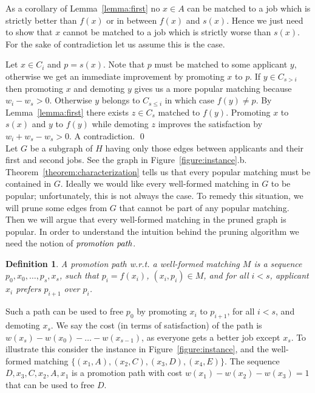\documentclass[11pt]{article}
\newcommand{\first}{f}
\newcommand{\second}{s}
\newcommand{\wrt}{{w.r.t.}\xspace}
\newtheorem{definition}{Definition}
\begin{document}
\myproof
As a corollary of Lemma~\ref{lemma:first} no $x \in A$ can be matched to a job which is strictly better than $\first(x)$ or in between $\first(x)$ and $\second(x)$. Hence we just need to show that $x$ cannot be matched to a job which is strictly worse than $\second(x)$. For the sake of contradiction let us assume this is the case.


Let $x \in C_i$ and $p=\second(x)$. Note that $p$ must be matched to some applicant $y$, otherwise we get an immediate improvement by promoting $x$ to $p$. If $y \in C_{s>i}$ then promoting $x$ and demoting $y$ gives us a more popular matching because $w_i - w_s > 0$. Otherwise $y$ belongs to $C_{s\leq i}$ in which case $\first(y) \neq p$. By Lemma~\ref{lemma:first} there exists $z \in C_s$ matched to $\first(y)$. Promoting $x$ to $\second(x)$ and $y$ to $\first(y)$ while demoting $z$ improves the satisfaction by $w_i + w_s - w_s > 0$. A contradiction.
\qed \\

Let $G$ be a subgraph of $H$ having only those edges between applicants and their first and second jobs. See the graph in Figure~\ref{figure:instance}.b. Theorem~\ref{theorem:characterization} tells us that every popular matching must be contained in $G$. Ideally we would like every well-formed matching in $G$ to be popular; unfortunately, this is not always the case. To remedy this situation, we will prune some edges from $G$ that cannot be part of any popular matching. Then we will argue that every well-formed matching in the pruned graph is popular. In order to understand the intuition behind the pruning algorithm we need the notion of $\emph{promotion path}$.

\begin{definition} A promotion path \wrt a well-formed matching $M$ is a sequence $p_0, x_0, \ldots, p_s, x_s$, such that $p_i = \first( x_i)$,  $(x_i,p_i) \in M$, and for all $i< s$, applicant $x_i$ prefers $p_{i+1}$ over $p_i$.
\end{definition}

Such a path can be used to free $p_0$ by promoting $x_i$ to $p_{i+1}$, for all $i < s$, and demoting $x_s$. We say the cost (in terms of satisfaction) of the path is $w(x_s) - w(x_0) - \ldots - w(x_{s-1})$, as everyone gets a better job except $x_s$. To illustrate this consider the instance in Figure~\ref{figure:instance}, and the well-formed matching $\{(x_1,A), (x_2,C), (x_3,D), (x_4,E) \}$. The sequence $D, x_3, C, x_2, A, x_1$ is a promotion path with cost $w(x_1) - w(x_2) - w(x_3)=1$ that can be used to free $D$.
\end{document}
